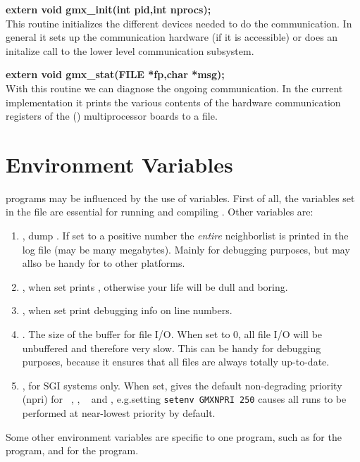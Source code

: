 \smallskip

{\bf extern void gmx\_init(int pid,int nprocs);}\\
This routine initializes the different devices needed to do the communication. In general it sets up the communication hardware (if it is accessible) or does an initalize call to the lower level communication subsystem.

\smallskip

{\bf extern void gmx\_stat(FILE *fp,char *msg);}\\
With this routine we can diagnose the ongoing communication. In the current implementation it prints the various contents of the hardware communication  registers of the (\intel) multiprocessor boards to a file.


\section{Environment Variables}
{\gromacs} programs may be influenced by the use of  
variables. First of all, the variables set in the  file
are essential for running and compiling {\gromacs}. Other variables are:
\begin{enumerate}
\item	{}, dump . 
	If set to a positive number the {\em entire}
	neighborlist is printed in the log file (may be many megabytes).
	Mainly for debugging purposes, but may allso be handy for
	 to other platforms.
\item	{}, when set prints , otherwise
	your {\gromacs} life will be dull and boring.
\item	{}, when set print debugging info on line numbers.
\item	{}. The size of the buffer for file I/O. When set
	to 0, all file I/O will be unbuffered and therefore very slow.
	This can be handy for debugging purposes, because it ensures
	that all files are always totally up-to-date.
\item   {}, for SGI systems only. When set, gives the
	default non-degrading priority (npri) for {\tt
	}, {\tt {}}, {\tt
	} and {\tt {}},
	e.g.\@ setting \verb'setenv GMXNPRI 250' causes all
	runs to be performed at near-lowest priority by default.
\end{enumerate}

Some other environment variables are specific to one program, such as
 for the {\tt {}} program, and
 for the {\tt {}} program.

